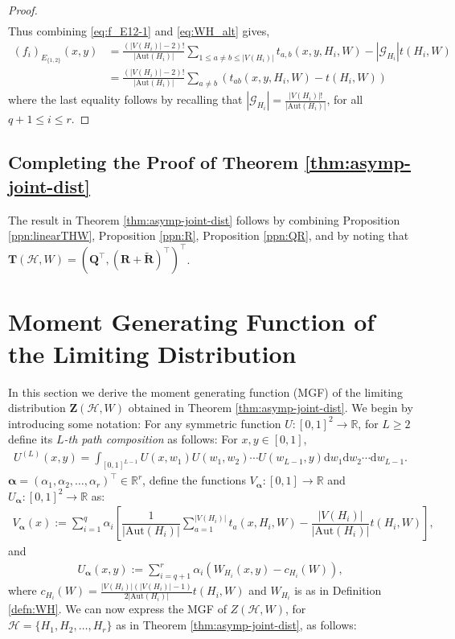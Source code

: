 \documentclass[11pt,reqno]{amsart}
\numberwithin{equation}{section}
\newcommand{\R}{{\mathbb R}}
\newcommand{\cH}{{\mathcal H}}
\newcommand\Aut{\mathrm{Aut}}
\theoremstyle{definition}
\begin{document}
\begin{proof}
\begin{align}
\end{align}
Thus combining \eqref{eq:f_E12-1} and \eqref{eq:WH_alt} gives,
\begin{align*}
    (f_{i})_{E_{\{1,2\}}}(x,y)
    & = \frac{(|V(H_{i})|-2)!}{|\Aut(H_{i})|}\sum_{1\leq a\neq b\leq |V(H_{i})|}t_{a, b}(x,y,H_{i},W) - |\mathscr{G}_{H_{i}}|t(H_{i},W)\\
    & = \frac{(|V(H_{i})|-2)!}{|\Aut(H_{i})|}\sum_{a\neq b}\left(t_{ab}(x,y,H_{i},W) - t(H_{i},W)\right) 
\end{align*}
where the last equality follows by recalling that $|\mathscr{G}_{H_{i}}| = \frac{|V(H_{i})|!}{|\mathrm{Aut}(H_{i})|}$, for all $q+1\leq i\leq r$.
\end{proof} 


\subsection{Completing the Proof of Theorem \ref{thm:asymp-joint-dist}} 

The result in Theorem \ref{thm:asymp-joint-dist} follows by combining Proposition \ref{ppn:linearTHW},  Proposition \ref{ppn:R}, Proposition \ref{ppn:QR}, and by noting that $\bm T(\cH, W) = (\bm Q^\top, (\bm R +  \tilde{\bm R})^\top)^\top$. 

\section{Moment Generating Function of the Limiting Distribution} 


In this section we derive the moment generating function (MGF) of the limiting distribution $\bm Z(\cH, W)$ obtained in Theorem \ref{thm:asymp-joint-dist}. We begin by introducing some notation: For any symmetric function $U: [0, 1]^2 \rightarrow \R$, for $L \geq 2$ define its {\it $L$-th path composition} as follows: For $x, y \in [0, 1]$,  
\begin{align}\label{def:UL}
U^{(L)}(x, y) = \int_{[0, 1]^{L -1 }} U(x, w_1) U(w_1, w_2) \cdots U(w_{L-1}, y) \mathrm d w_1 \mathrm d w_2 \cdots \mathrm d w_{L-1} . 
\end{align} 
$\bm{\alpha} = (\alpha_1, \alpha_2, \ldots, \alpha_r)^\top \in\mathbb{R}^{r}$, define the functions $V_{\bm \alpha} : [0, 1] \rightarrow \mathbb R$ and $U_{\bm \alpha} : [0, 1]^2 \rightarrow \mathbb R$ as: 
\begin{align}\label{eq:def-V}
    V_{\bm \alpha}(x) := \sum_{i=1}^{q}\alpha_{i}\left[\dfrac{1}{\left|\text{Aut}(H_{i})\right|}\sum_{a=1}^{|V(H_{i})|}t_{a}(x,H_{i},W) - \dfrac{|V(H_{i})|}{\left|\text{Aut}(H_{i})\right|}t(H_{i},W)\right] , 
\end{align}
and 
\begin{align}\label{eq:def-U}
    U_{\bm \alpha} (x, y) := \sum_{i=q+1}^{r}\alpha_{i}\left(W_{H_{i}} (x, y) - c_{H_i}(W) \right)  , 
\end{align} 
where $c_{H_i}(W) = \frac{ |V(H_{i})| ( |V(H_i)| - 1) }{2 \left|\text{Aut}(H_{i})\right|}t(H_{i},W)$ and $W_{H_{i}}$ is as in Definition \ref{defn:WH}. We can now express the MGF of $Z(\cH, W)$, for $\mathcal{H} = \{H_1, H_2 , \ldots, H_r\}$ as in Theorem \ref{thm:asymp-joint-dist}, as follows: 
\end{document}
